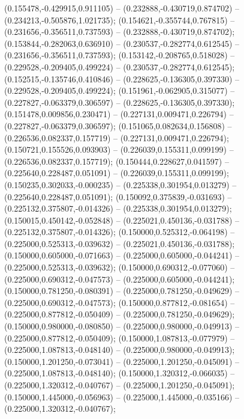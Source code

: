  (0.155478,-0.429915,0.911105) -- (0.232888,-0.430719,0.874702) -- (0.234213,-0.505876,1.021735);
 (0.154621,-0.355744,0.767815) -- (0.231656,-0.356511,0.737593) -- (0.232888,-0.430719,0.874702);
 (0.153844,-0.282063,0.636910) -- (0.230537,-0.282774,0.612545) -- (0.231656,-0.356511,0.737593);
 (0.153142,-0.208765,0.518028) -- (0.229528,-0.209405,0.499224) -- (0.230537,-0.282774,0.612545);
 (0.152515,-0.135746,0.410846) -- (0.228625,-0.136305,0.397330) -- (0.229528,-0.209405,0.499224);
 (0.151961,-0.062905,0.315077) -- (0.227827,-0.063379,0.306597) -- (0.228625,-0.136305,0.397330);
 (0.151478,0.009856,0.230471) -- (0.227131,0.009471,0.226794) -- (0.227827,-0.063379,0.306597);
 (0.151065,0.082634,0.156808) -- (0.226536,0.082337,0.157719) -- (0.227131,0.009471,0.226794);
 (0.150721,0.155526,0.093903) -- (0.226039,0.155311,0.099199) -- (0.226536,0.082337,0.157719);
 (0.150444,0.228627,0.041597) -- (0.225640,0.228487,0.051091) -- (0.226039,0.155311,0.099199);
 (0.150235,0.302033,-0.000235) -- (0.225338,0.301954,0.013279) -- (0.225640,0.228487,0.051091);
 (0.150092,0.375839,-0.031693) -- (0.225132,0.375807,-0.014326) -- (0.225338,0.301954,0.013279);
 (0.150015,0.450142,-0.052848) -- (0.225021,0.450136,-0.031788) -- (0.225132,0.375807,-0.014326);
 (0.150000,0.525312,-0.064198) -- (0.225000,0.525313,-0.039632) -- (0.225021,0.450136,-0.031788);
 (0.150000,0.605000,-0.071663) -- (0.225000,0.605000,-0.044241) -- (0.225000,0.525313,-0.039632);
 (0.150000,0.690312,-0.077060) -- (0.225000,0.690312,-0.047573) -- (0.225000,0.605000,-0.044241);
 (0.150000,0.781250,-0.080391) -- (0.225000,0.781250,-0.049629) -- (0.225000,0.690312,-0.047573);
 (0.150000,0.877812,-0.081654) -- (0.225000,0.877812,-0.050409) -- (0.225000,0.781250,-0.049629);
 (0.150000,0.980000,-0.080850) -- (0.225000,0.980000,-0.049913) -- (0.225000,0.877812,-0.050409);
 (0.150000,1.087813,-0.077979) -- (0.225000,1.087813,-0.048140) -- (0.225000,0.980000,-0.049913);
 (0.150000,1.201250,-0.073041) -- (0.225000,1.201250,-0.045091) -- (0.225000,1.087813,-0.048140);
 (0.150000,1.320312,-0.066035) -- (0.225000,1.320312,-0.040767) -- (0.225000,1.201250,-0.045091);
 (0.150000,1.445000,-0.056963) -- (0.225000,1.445000,-0.035166) -- (0.225000,1.320312,-0.040767);
